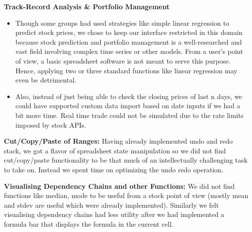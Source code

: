 \documentclass[12pt]{article}
\begin{document}
    \begin{description}

        \item \textbf{Track-Record Analysis \& Portfolio Management}
        \begin{itemize}
            \item Though some groups had used strategies like simple linear regression to predict stock prices, we chose to keep our interface restricted in this domain because stock prediction and portfolio management is a well-researched and vast field involving complex time series or other models. From a user's point of view, a basic spreadsheet software is not meant to serve this purpose. Hence, applying two or three standard functions like linear regression may even be detrimental.
            \item Also, instead of just being able to check the closing prices of last n days, we could have supported custom data import based on date inputs if we had a bit more time. Real time trade could not be simulated due to the rate limits imposed by stock APIs.
        \end{itemize}
        \item \textbf{Cut/Copy/Paste of Ranges:}
        Having already implemented undo and redo stack, we got a flavor of spreadsheet state manipulation so we did not find cut/copy/paste functionality to be that much of an intellectually challenging task to take on. Instead we spent time on optimizing the undo redo operation.

        \item \textbf{Visualising Dependency Chains and other Functions:}
        We did not find functions like median, mode to be useful from a stock point of view (mostly mean and stdev are useful which were already implemented). Similarly we felt visualising dependency chains had less utility after we had implemented a formula bar that displays the formula in the current cell. \\
    \end{description}
\end{document}
